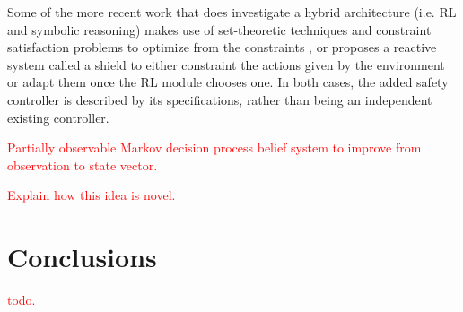 \documentclass[a4paper,11pt]{article}
\begin{document}
\medskip

Some of the more recent work that does investigate a hybrid architecture (i.e. RL and symbolic reasoning) makes use of
set-theoretic techniques and constraint satisfaction problems to optimize from the constraints \cite{Li2021SafeRL}, or proposes a reactive system called a shield \cite{alshiekh2017} to either constraint the actions given by the environment or adapt them once the RL module chooses one. 
In both cases, the added safety controller is described by its specifications, rather than being an independent existing controller. 

\medskip

\textcolor{red}{Partially observable Markov decision process belief system to improve from observation to state vector.}

\medskip

\textcolor{red}{Explain how this idea is novel.}

\section{Conclusions}
\textcolor{red}{todo.}

\newpage



\end{document}
